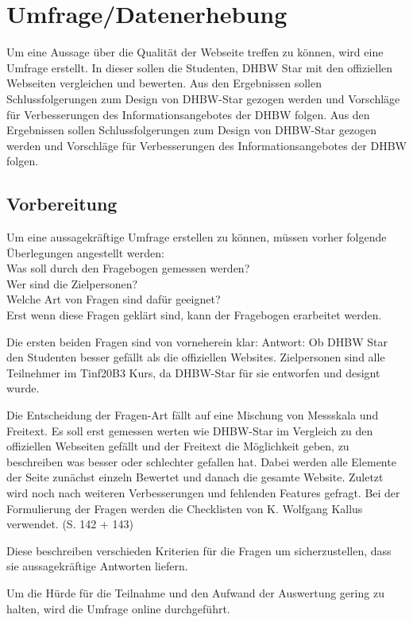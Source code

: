\chapter{Umfrage/Datenerhebung}
Um eine Aussage über die Qualität der Webseite treffen zu können, wird eine Umfrage erstellt. In dieser sollen die Studenten, DHBW Star mit den offiziellen Webseiten vergleichen und bewerten. Aus den Ergebnissen sollen Schlussfolgerungen zum Design von DHBW-Star gezogen werden und Vorschläge für Verbesserungen des Informationsangebotes der DHBW folgen.
Aus den Ergebnissen sollen Schlussfolgerungen zum Design von DHBW-Star gezogen werden und Vorschläge für Verbesserungen des Informationsangebotes der DHBW folgen.

\section{Vorbereitung}
Um eine aussagekräftige Umfrage erstellen zu können, müssen vorher folgende Überlegungen angestellt werden: \\
Was soll durch den Fragebogen gemessen werden? \\
Wer sind die Zielpersonen? \\
Welche Art von Fragen sind dafür geeignet? \\
Erst wenn diese Fragen geklärt sind, kann der Fragebogen erarbeitet werden.

Die ersten beiden Fragen sind von vorneherein klar:
Antwort: Ob DHBW Star den Studenten besser gefällt als die offiziellen Websites.
Zielpersonen sind alle Teilnehmer im Tinf20B3 Kurs, da DHBW-Star für sie entworfen und designt wurde.

Die Entscheidung der Fragen-Art fällt auf eine Mischung von Messskala und Freitext. Es soll erst gemessen werten wie DHBW-Star im Vergleich zu den offiziellen Webseiten gefällt und der Freitext die Möglichkeit geben, zu beschreiben was besser oder schlechter gefallen hat.
Dabei werden alle Elemente der Seite zunächst einzeln Bewertet und danach die gesamte Website.
Zuletzt wird noch nach weiteren Verbesserungen und fehlenden Features gefragt.
Bei der Formulierung der Fragen werden die Checklisten von K. Wolfgang Kallus verwendet.
\cite{fragebogenKallus}(S. 142 + 143)

Diese beschreiben verschieden Kriterien für die Fragen um sicherzustellen, dass sie aussagekräftige Antworten liefern.

Um die Hürde für die Teilnahme und den Aufwand der Auswertung gering zu halten, wird die Umfrage online durchgeführt.

